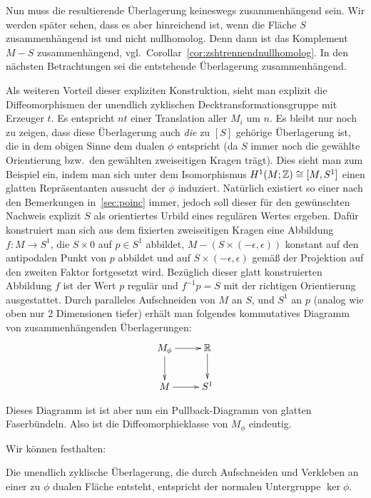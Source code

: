 \begin{constr}
	Nun muss die resultierende Überlagerung keineswegs zusammenhängend sein. Wir werden später sehen, dass es aber hinreichend ist, wenn die Fläche $S$ zusammenhängend ist und nicht nullhomolog. Denn dann ist das Komplement $M-S$ zusammenhängend, vgl.\ Corollar~\ref{cor:zshtrennendnullhomolog}. In den nächsten Betrachtungen sei die entstehende Überlagerung zusammenhängend.

	Als weiteren Vorteil dieser expliziten Konstruktion, sieht man explizit die Diffeomorphismen der unendlich zyklischen Decktransformationsgruppe mit Erzeuger $t$. Es entspricht $nt$ einer Translation aller $M_i$ um $n$. Es bleibt nur noch zu zeigen, dass diese Überlagerung auch \textit{die} zu $[S]$ gehörige Überlagerung ist, die in dem obigen Sinne dem dualen $\phi$ entspricht (da $S$ immer noch die gewählte Orientierung bzw.\ den gewählten zweiseitigen Kragen trägt). Dies sieht man zum Beispiel ein, indem man sich unter dem Isomorphismus $H^1(M;\mathbb{Z})\cong [M,S^1]$ einen glatten Repräsentanten aussucht der $\phi$ induziert. Natürlich existiert so einer nach den Bemerkungen in~\ref{sec:poinc} immer, jedoch soll dieser für den gewünschten Nachweis explizit $S$ als orientiertes Urbild eines regulären Wertes ergeben. Dafür konstruiert man sich aus dem fixierten zweiseitigen Kragen eine Abbildung $f:M\to S^1$, die $S\times 0$ auf $p\in S^1$ abbildet, $M-(S \times (-\epsilon,\epsilon))$ konstant auf den antipodalen Punkt von $p$ abbildet und auf $S\times (-\epsilon,\epsilon)$ gemäß der Projektion auf den zweiten Faktor fortgesetzt wird. Bezüglich dieser glatt konstruierten Abbildung $f$ ist der Wert $p$ regulär und $f^{-1}p=S$ mit der richtigen Orientierung ausgestattet. Durch paralleles Aufschneiden von $M$ an $S$, und $S^1$ an $p$ (analog wie oben nur 2 Dimensionen tiefer) erhält man folgendes kommutatives Diagramm von zusammenhängenden Überlagerungen:
	\[
		\begin{xy}
			\xymatrix{M_\phi \ar[r] \ar[d] &\RR \ar[d]\\
						M \ar[r]& S^1}
		\end{xy}
	\]

	Dieses Diagramm ist ist aber nun ein Pullback-Diagramm von glatten Faserbündeln. Also ist die Diffeomorphieklasse von $M_\phi$ eindeutig. 
\end{constr}
Wir können festhalten:
\begin{cor}
\label{cor:verklvertr}
		Die unendlich zyklische Überlagerung, die durch Aufschneiden und Verkleben an einer zu $\phi$ dualen Fläche entsteht, entspricht der normalen Untergruppe $ \ker\phi$.
\end{cor}
